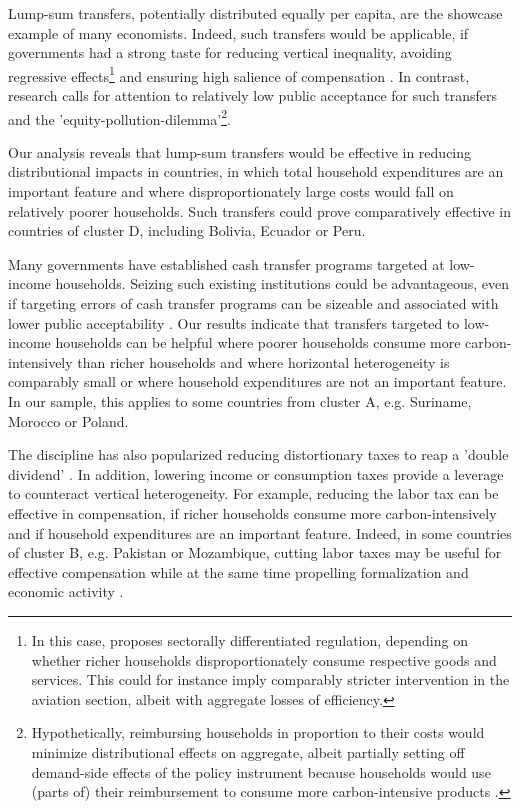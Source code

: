 \documentclass[12pt, a4paper]{article}
\begin{document}
Lump-sum transfers, potentially distributed equally per capita, are the showcase example of many economists. Indeed, such transfers would be applicable, if governments had a strong taste for reducing vertical inequality, avoiding regressive effects\footnote{In this case, \textcite{Stiglitz.2019} proposes sectorally differentiated regulation, depending on whether richer households disproportionately consume respective goods and services. This could for instance imply comparably stricter intervention in the aviation section, albeit with aggregate losses of efficiency.} and ensuring high salience of compensation \autocite{Chetty.2009}. In contrast, research calls for attention to relatively low public acceptance for such transfers and the 'equity-pollution-dilemma'\footnote{Hypothetically, reimbursing households in proportion to their costs would minimize distributional effects on aggregate, albeit partially setting off demand-side effects of the policy instrument because households would use (parts of) their reimbursement to consume more carbon-intensive products \autocite{Stiglitz.2019}.}\autocite{Sager.2019}.

Our analysis reveals that lump-sum transfers would be effective in reducing distributional impacts in countries, in which total household expenditures are an important feature and where disproportionately large costs would fall on relatively poorer households. Such transfers could prove comparatively effective in countries of cluster D, including Bolivia, Ecuador or Peru. %

Many governments have established cash transfer programs targeted at low-income households. Seizing such existing institutions could be advantageous, even if targeting errors of cash transfer programs can be sizeable \autocite{Banerjee.2022} and associated with lower public acceptability \autocite{Bah.2019}. Our results indicate that transfers targeted to low-income households can be helpful where poorer households consume more carbon-intensively than richer households and where horizontal heterogeneity is comparably small or where household expenditures are not an important feature. In our sample, this applies to some countries from cluster A, e.g. Suriname, Morocco or Poland.

The discipline has also popularized reducing distortionary taxes to reap a 'double dividend' \autocite{Bovenberg.1996}. In addition, lowering income or consumption taxes provide a leverage to counteract vertical heterogeneity. For example, reducing the labor tax can be effective in compensation, if richer households consume more carbon-intensively and if household expenditures are an important feature. Indeed, in some countries of cluster B, e.g. Pakistan or Mozambique, cutting labor taxes may be useful for effective compensation while at the same time propelling formalization \autocite{Jessen.2021,Rocha.2018} and economic activity \autocite{Ulyssea.2018}.
\end{document}
